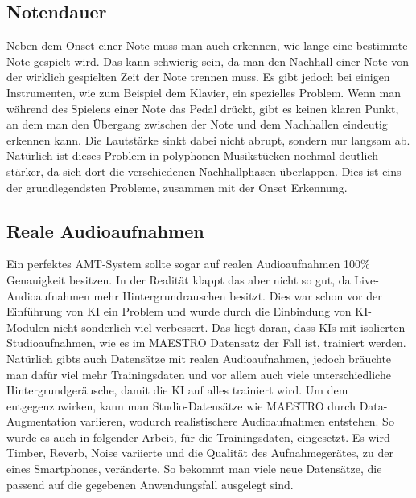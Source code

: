 \subsection{Notendauer}
Neben dem Onset einer Note muss man auch erkennen, wie lange eine bestimmte Note gespielt wird.
Das kann schwierig sein, da man den Nachhall einer Note von der wirklich gespielten Zeit der Note trennen muss.
Es gibt jedoch bei einigen Instrumenten, wie zum Beispiel dem Klavier, ein spezielles Problem.
Wenn man während des Spielens einer Note das Pedal drückt, gibt es keinen klaren Punkt,
an dem man den Übergang zwischen der Note und dem Nachhallen eindeutig erkennen kann.
Die Lautstärke sinkt dabei nicht abrupt, sondern nur langsam ab.
Natürlich ist dieses Problem in polyphonen Musikstücken nochmal deutlich stärker,
da sich dort die verschiedenen Nachhallphasen überlappen.
Dies ist eins der grundlegendsten Probleme, zusammen mit der Onset Erkennung.
\cite{jamshidi2024machine}

\subsection{Reale Audioaufnahmen}
Ein perfektes AMT-System sollte sogar auf realen Audioaufnahmen 100\% Genauigkeit besitzen.
In der Realität klappt das aber nicht so gut, da Live-Audioaufnahmen mehr Hintergrundrauschen besitzt.
Dies war schon vor der Einführung von KI ein Problem und wurde durch die Einbindung
von KI-Modulen nicht sonderlich viel verbessert.
Das liegt daran, dass KIs mit isolierten Studioaufnahmen, wie es im MAESTRO Datensatz der Fall ist, trainiert werden.
Natürlich gibts auch Datensätze mit realen Audioaufnahmen, jedoch bräuchte man dafür viel mehr Trainingsdaten und
vor allem auch viele unterschiedliche Hintergrundgeräusche, damit die KI auf alles trainiert wird.
Um dem entgegenzuwirken, kann man Studio-Datensätze wie MAESTRO durch Data-Augmentation variieren,
wodurch realistischere Audioaufnahmen entstehen.
So wurde es auch in folgender Arbeit, für die Trainingsdaten, eingesetzt.
\cite{kusaka2024mobile}
Es wird Timber, Reverb, Noise variierte und die Qualität des Aufnahmegerätes, zu der eines Smartphones, veränderte.
So bekommt man viele neue Datensätze, die passend auf die gegebenen Anwendungsfall ausgelegt sind.

